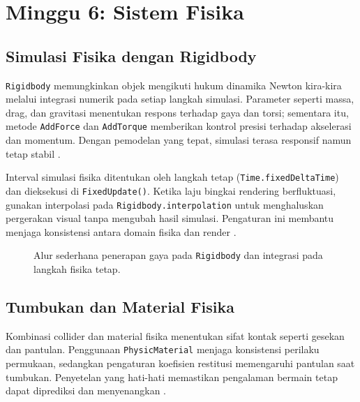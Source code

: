 \documentclass[../main.tex]{subfiles}
\begin{document}
\chapter{Minggu 6: Sistem Fisika}

\section{Simulasi Fisika dengan Rigidbody}
\texttt{Rigidbody} memungkinkan objek mengikuti hukum dinamika Newton kira-kira melalui integrasi numerik pada setiap langkah simulasi. Parameter seperti massa, drag, dan gravitasi menentukan respons terhadap gaya dan torsi; sementara itu, metode \texttt{AddForce} dan \texttt{AddTorque} memberikan kontrol presisi terhadap akselerasi dan momentum. Dengan pemodelan yang tepat, simulasi terasa responsif namun tetap stabil \parencite{unity-rigidbody}.

Interval simulasi fisika ditentukan oleh langkah tetap (\texttt{Time.fixedDeltaTime}) dan dieksekusi di \texttt{FixedUpdate()}. Ketika laju bingkai rendering berfluktuasi, gunakan interpolasi pada \texttt{Rigidbody.interpolation} untuk menghaluskan pergerakan visual tanpa mengubah hasil simulasi. Pengaturan ini membantu menjaga konsistensi antara domain fisika dan render \parencite{unity-rigidbody}.

\begin{figure}[h]
  \centering
  \caption{Alur sederhana penerapan gaya pada \texttt{Rigidbody} dan integrasi pada langkah fisika tetap.}
\end{figure}

\section{Tumbukan dan Material Fisika}
Kombinasi collider dan material fisika menentukan sifat kontak seperti gesekan dan pantulan. Penggunaan \texttt{PhysicMaterial} menjaga konsistensi perilaku permukaan, sedangkan pengaturan koefisien restitusi memengaruhi pantulan saat tumbukan. Penyetelan yang hati-hati memastikan pengalaman bermain tetap dapat diprediksi dan menyenangkan \parencite{unity-collider,unity-physic-material}.
\end{document}
